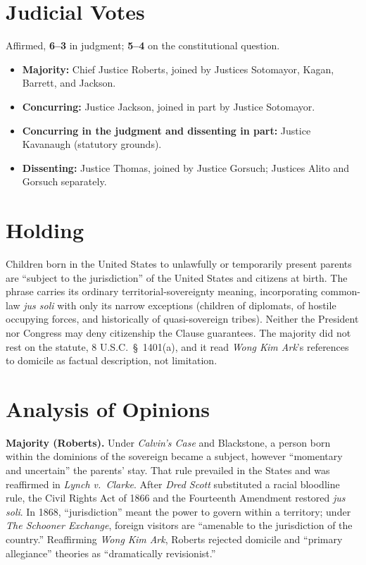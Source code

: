 \documentclass[12pt]{article}
\begin{document}
\section{Judicial Votes}

Affirmed, \textbf{6--3} in judgment; \textbf{5--4} on the constitutional question.
\begin{itemize}
\item \textbf{Majority:} Chief Justice Roberts, joined by Justices Sotomayor, Kagan, Barrett, and Jackson.
\item \textbf{Concurring:} Justice Jackson, joined in part by Justice Sotomayor.
\item \textbf{Concurring in the judgment and dissenting in part:} Justice Kavanaugh (statutory grounds).
\item \textbf{Dissenting:} Justice Thomas, joined by Justice Gorsuch; Justices Alito and Gorsuch separately.
\end{itemize}

\section{Holding}

Children born in the United States to unlawfully or temporarily present parents are ``subject to the jurisdiction'' of the United States and citizens at birth. The phrase carries its ordinary territorial-sovereignty meaning, incorporating common-law \textit{jus soli} with only its narrow exceptions (children of diplomats, of hostile occupying forces, and historically of quasi-sovereign tribes). Neither the President nor Congress may deny citizenship the Clause guarantees. The majority did not rest on the statute, 8 U.S.C.\ \S\ 1401(a), and it read \textit{Wong Kim Ark}'s references to domicile as factual description, not limitation.

\section{Analysis of Opinions}

\textbf{Majority (Roberts).} Under \textit{Calvin's Case} and Blackstone, a person born within the dominions of the sovereign became a subject, however ``momentary and uncertain'' the parents' stay. That rule prevailed in the States and was reaffirmed in \textit{Lynch v.\ Clarke}. After \textit{Dred Scott} substituted a racial bloodline rule, the Civil Rights Act of 1866 and the Fourteenth Amendment restored \textit{jus soli}. In 1868, ``jurisdiction'' meant the power to govern within a territory; under \textit{The Schooner Exchange}, foreign visitors are ``amenable to the jurisdiction of the country.'' Reaffirming \textit{Wong Kim Ark}, Roberts rejected domicile and ``primary allegiance'' theories as ``dramatically revisionist.''
\end{document}
